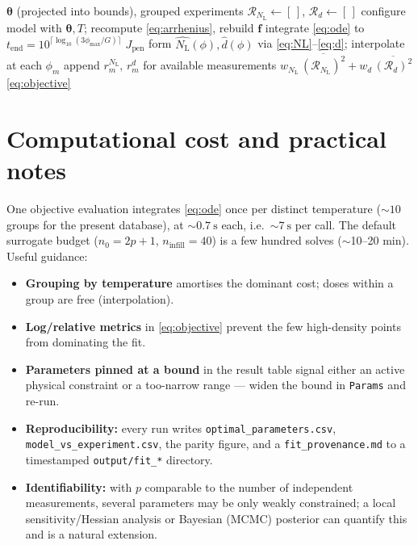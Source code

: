 \documentclass[11pt]{article}
\newcommand{\param}{\bm{\theta}}
\newcommand{\NL}{N_{\mathrm{L}}}
\newcommand{\dpa}{\phi}
\begin{document}
\begin{algorithm}[ht]
\caption{Objective evaluation $J(\param)$}
\label{alg:obj}
\begin{algorithmic}[1]
\Require $\param$ (projected into bounds), grouped experiments
\State $\mathcal{R}_{\NL}\gets[\,]$, $\mathcal{R}_{d}\gets[\,]$
\For{each temperature group $(T,\{\dpa_m,\NL^m,d^m\})$}
   \State configure model with $\param,T$; recompute \eqref{eq:arrhenius}, rebuild $\bm f$
   \State integrate \eqref{eq:ode} to $t_{\mathrm{end}}=10^{\lceil\log_{10}(3\dpa_{\max}/G)\rceil}$
    \State \Return $J_{\mathrm{pen}}$ \EndIf
   \State form $\widehat{\NL}(\dpa),\widehat d(\dpa)$ via \eqref{eq:NL}--\eqref{eq:d}; interpolate at each $\dpa_m$
   \State append $r^{\NL}_m,\,r^{d}_m$ for available measurements
\EndFor
\State \Return $w_{\NL}\,\overline{(\mathcal R_{\NL})^2}+w_{d}\,\overline{(\mathcal R_{d})^2}$ \eqref{eq:objective}
\end{algorithmic}
\end{algorithm}

\section{Computational cost and practical notes}\label{sec:cost}
One objective evaluation integrates \eqref{eq:ode} once per distinct temperature
($\sim\!10$ groups for the present database), at $\sim\!\SI{0.7}{\second}$ each,
i.e.\ $\sim\!\SI{7}{\second}$ per call. The default surrogate budget
($n_0=2p+1$, $n_{\mathrm{infill}}=40$) is a few hundred solves (\(\sim\)10--20 min).
Useful guidance:
\begin{itemize}\setlength\itemsep{1pt}
  \item \textbf{Grouping by temperature} amortises the dominant cost; doses within a
        group are free (interpolation).
  \item \textbf{Log/relative metrics} in \eqref{eq:objective} prevent the few
        high-density points from dominating the fit.
  \item \textbf{Parameters pinned at a bound} in the result table signal either an
        active physical constraint or a too-narrow range --- widen the bound in
        \texttt{Params} and re-run.
  \item \textbf{Reproducibility:} every run writes \texttt{optimal\_parameters.csv},
        \texttt{model\_vs\_experiment.csv}, the parity figure, and a
        \texttt{fit\_provenance.md} to a timestamped \texttt{output/fit\_*} directory.
  \item \textbf{Identifiability:} with $p$ comparable to the number of independent
        measurements, several parameters may be only weakly constrained; a local
        sensitivity/Hessian analysis or Bayesian (MCMC) posterior
        \citep{Tarantola2005} can quantify this and is a natural extension.
\end{itemize}
\end{document}
